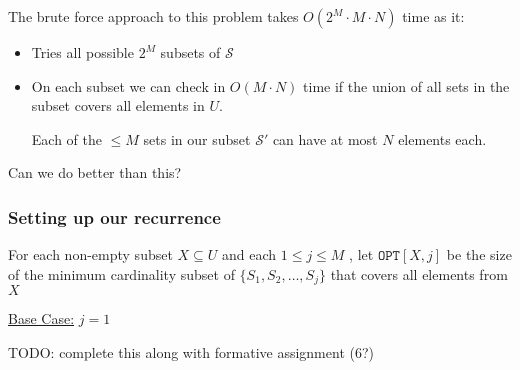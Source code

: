 \documentclass{article}
\begin{document}
The brute force approach to this problem takes $O(2^{M}\cdot M\cdot N)$ time as it:

\begin{itemize}
  \item Tries all possible $2^{M}$ subsets of $\mathcal{S}$
  \item On each subset we can check in $O(M\cdot N)$ time if the union of all sets in the subset covers all elements in $U$.

        Each of the $\leq M$ sets in our subset $\mathcal{S'}$ can have at most $N$ elements each.
\end{itemize}

Can we do better than this?

\subsubsection{Setting up our recurrence}

For each non-empty subset $X\subseteq U$ and each $1\leq j\leq M$ , let $\texttt{OPT}[X,j] $ be the size of the minimum cardinality subset of $\{ S_{1},S_{2},\ldots,S_{j} \} $ that covers all elements from $X$

\underline{Base Case:} $j=1$

TODO: complete this along with formative assignment (6?)
\end{document}
